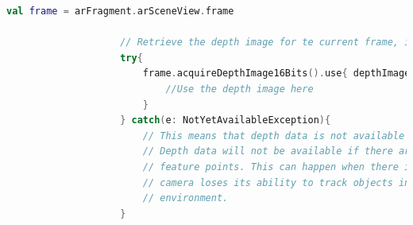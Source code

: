 \documentclass[crop=false, class=book]{standalone}
\begin{document}
		\begin{center}
				\begin{minipage}{0.95\textwidth}
					\begin{lstlisting}[caption={ Controllo supporto depth API}, label={lst: Controllo supporto depth API}, 		language=Kotlin]
					val frame = arFragment.arSceneView.frame

					// Retrieve the depth image for te current frame, if available
					try{
						frame.acquireDepthImage16Bits().use{ depthImage ->
							//Use the depth image here
						}
					} catch(e: NotYetAvailableException){
						// This means that depth data is not available yet.
  						// Depth data will not be available if there are no tracked
  						// feature points. This can happen when there is no motion, or when the
  						// camera loses its ability to track objects in the surrounding
  						// environment. 
					}
					
					\end{lstlisting}
			\end{minipage}
		\end{center}
		
\end{document}
